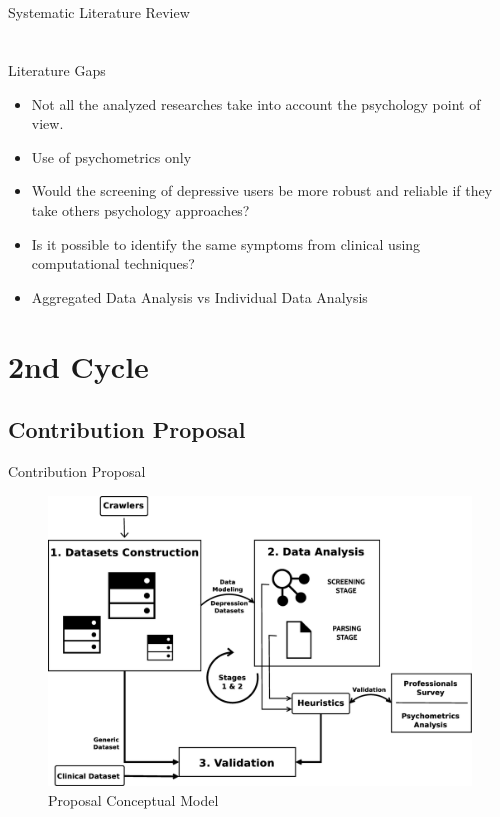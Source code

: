\documentclass[aspectratio=169,10pt,xcolor={dvipsnames}]{beamer}
\begin{document}
\begin{frame}{Systematic Literature Review}
\begin{table}[]
{\begin{tabular}{c|c|c|c|c|c|c|ccc|c|c}
    \end{tabular}%
    }
    \caption{}
    \label{tab:featuresOrganization}
    \end{table}

\end{frame}


\begin{frame}{Literature Gaps}
  \begin{itemize}
    \item Not all the analyzed researches take into account the psychology point of view. 
    \item Use of psychometrics only
    \item Would the screening of depressive users be more robust and reliable if they take others psychology approaches?
    \item Is it possible to identify the same symptoms from clinical using computational techniques?
    \item Aggregated Data Analysis vs Individual Data Analysis
  \end{itemize}
\end{frame}

\section{2nd Cycle}
\subsection{Contribution Proposal}

\begin{frame}{Contribution Proposal}
  \begin{figure}
    \centering
    \includegraphics[scale=.175]{Graphics/conceptualModel.eps}
    \caption{\small{Proposal Conceptual Model}}
    \label{fig:conceptualModel}
  \end{figure}
\end{frame}
\end{document}
